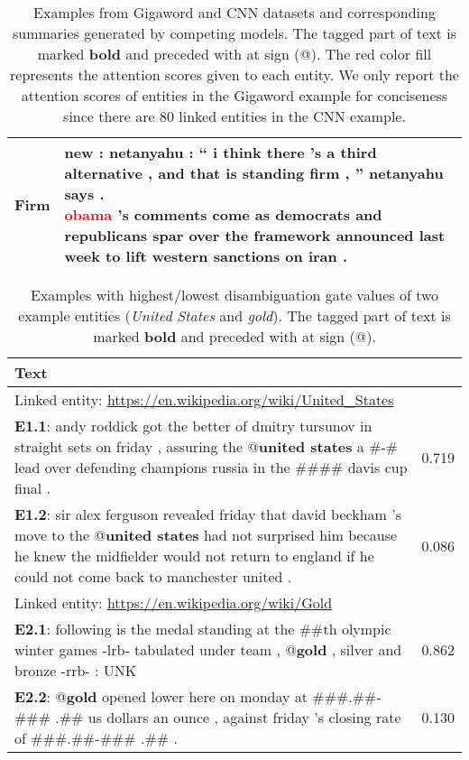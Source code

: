\documentclass[11pt,a4paper]{article}
\begin{document}
\begin{table*}[htbp]
\begin{subtable}{\textwidth}
\begin{tabularx}{\textwidth}{|l|p{68.3em}|}
    Firm & 
          \makecell[l]{
          new : netanyahu : `` i think there 's a third alternative , and that is standing firm , '' netanyahu says . \\
          \textcolor{red}{obama} 's comments come as democrats and republicans spar over the framework announced last week to lift western sanctions on iran .} \\ \hline
    \end{tabularx}\end{subtable}
  \caption{Examples from Gigaword and CNN datasets and corresponding summaries generated by competing models. The tagged part of text is marked \textbf{bold} and preceded with at sign (@). The red color fill represents the attention scores given to each entity. We only report the attention scores of entities in the Gigaword example for conciseness since there are 80 linked entities in the CNN example.}
  \label{tab:sample}\end{table*}

\begin{table}[ht]
    \tiny
    \centering
    \begin{tabularx}{0.47\textwidth}{|X|c|}
        \hline
        Text &  \\ \hline
        \hline
        \multicolumn{2}{|l|}{Linked entity: \url{https://en.wikipedia.org/wiki/United_States}} \\
        \hline
        \textbf{E1.1}: andy roddick got the better of dmitry tursunov in straight sets on friday , assuring the @\textbf{united states} a \#-\# lead over defending champions russia in the \#\#\#\# davis cup final . & 0.719 \\ \hline
        \textbf{E1.2}: sir alex ferguson revealed friday that david beckham 's move to the @\textbf{united states} had not surprised him because he knew the midfielder would not return to england if he could not come back to manchester united . & 0.086 \\ \hline
        \hline
        \multicolumn{2}{|l|}{Linked entity: \url{https://en.wikipedia.org/wiki/Gold}} \\
        \hline
        \textbf{E2.1}: following is the medal standing at the \#\#th olympic winter games -lrb- tabulated under team , @\textbf{gold} , silver and bronze -rrb- : UNK & 0.862 \\ \hline
        \textbf{E2.2}: @\textbf{gold} opened lower here on monday at \#\#\#.\#\#-\#\#\# .\#\# us dollars an ounce , against friday 's closing rate of \#\#\#.\#\#-\#\#\# .\#\# . & 0.130 \\ \hline
    \end{tabularx}
    \caption{Examples with highest/lowest disambiguation gate  values of two example entities (\textit{United States} and \textit{gold}). The tagged part of text is marked \textbf{bold} and preceded with at sign (@).}
    \label{tab:disambig}
\end{table}
\end{document}

